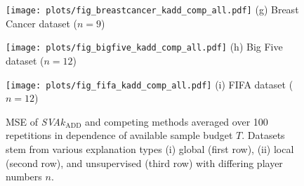 \begin{figure*}[ht]
\begin{minipage}[c]{0.32\textwidth}
\end{minipage}
%
\begin{minipage}[c]{0.32\textwidth}
    \centering
    \texttt{[image: plots/fig\_breastcancer\_kadd\_comp\_all.pdf]}
    (g) Breast Cancer dataset ($n=9$)
    \label{fig:breastcancer_kadd_comp_all}
\end{minipage}
\begin{minipage}[c]{0.32\textwidth}
    \centering
    \texttt{[image: plots/fig\_bigfive\_kadd\_comp\_all.pdf]}
    (h) Big Five dataset ($n=12$)
    \label{fig:bigfive_kadd_comp_all}
\end{minipage}
\begin{minipage}[c]{0.32\textwidth}
    \centering
    \texttt{[image: plots/fig\_fifa\_kadd\_comp\_all.pdf]}
    (i) FIFA dataset ($n=12$)
    \label{fig:fifa_kadd_comp_all}
\end{minipage}
\caption{MSE of \emph{SVA}$k_{\text{ADD}}$ and competing methods averaged over 100 repetitions in dependence of available sample budget $T$. Datasets stem from various explanation types (i) global (first row), (ii) local (second row), and unsupervised (third row) with differing player numbers $n$.}
\label{fig:results_comp_all}
\end{figure*}